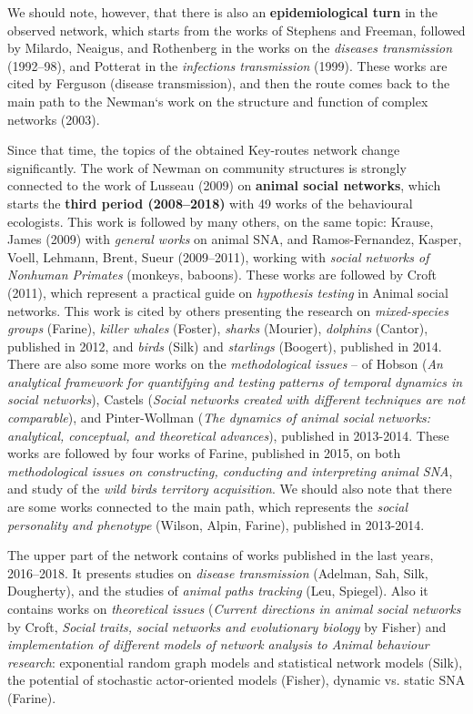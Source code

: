 \documentclass[11pt]{article} %
\begin{document}
We should note, however, that there is also an \textbf{epidemiological turn} in the observed network, which starts from the works of Stephens and Freeman, followed by Milardo, Neaigus, and Rothenberg in the works on the \textit{diseases transmission} (1992--98), and Potterat in the \textit{infections transmission} (1999). These works are cited by Ferguson (disease transmission), and then the route comes back to the main path to the Newman`s work on the structure and function of complex networks (2003). \medskip 

Since that time, the topics of the obtained Key-routes network change significantly. The work of Newman on community structures is strongly connected to the work of Lusseau (2009) on \textbf{animal social networks}, which starts the \textbf{third period (2008--2018)} with 49 works of the behavioural ecologists. This work is followed by many others, on the same topic: Krause, James (2009) with \textit{general works} on animal SNA, and Ramos-Fernandez, Kasper, Voell, Lehmann, Brent, Sueur (2009--2011), working with \textit{social networks of Nonhuman Primates} (monkeys, baboons). These works are followed by Croft (2011), which represent a practical guide on \textit{hypothesis testing} in Animal social networks. This work is cited by others presenting the research on \textit{mixed-species groups} (Farine), \textit{killer whales} (Foster), \textit{sharks} (Mourier), \textit{dolphins} (Cantor), published in 2012, and \textit{birds} (Silk) and \textit{starlings} (Boogert), published in 2014. There are also some more works on the \textit{methodological issues} -- of Hobson (\textit{An analytical framework for quantifying and testing patterns of temporal dynamics in social networks}), Castels (\textit{Social networks created with different techniques are not comparable}), and Pinter-Wollman (\textit{The dynamics of animal social networks: analytical, conceptual, and theoretical advances}), published in 2013-2014. These works are followed by four works of Farine, published in 2015, on both \textit{methodological issues on constructing, conducting and interpreting animal SNA}, and study of the \textit{wild birds territory acquisition}. We should also note that there are some works connected to the main path, which represents the \textit{social personality and phenotype} (Wilson, Alpin, Farine), published in 2013-2014.\medskip   
 
The upper part of the network contains of works published in the last years, 2016--2018. It presents studies on \textit{disease transmission} (Adelman, Sah, Silk, Dougherty), and the studies of \textit{animal paths tracking} (Leu, Spiegel). Also it contains works on \textit{theoretical issues} (\textit{Current directions in animal social networks} by Croft, \textit{Social traits, social networks and evolutionary biology} by Fisher) and \textit{implementation of different models of network analysis to Animal behaviour research}:  exponential random graph models and statistical network models (Silk), the potential of stochastic actor-oriented models (Fisher), dynamic vs. static SNA (Farine). \medskip   
\end{document}
